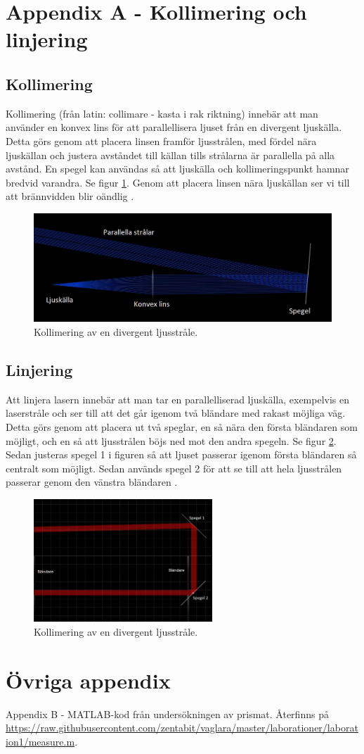 \documentclass[a4paper]{article}
\begin{document}
\pagebreak
\section{Appendix A - Kollimering och linjering}
\subsection{Kollimering}
Kollimering (från latin: collimare - kasta i rak riktning) innebär att man använder en konvex lins
för att parallellisera ljuset från en divergent ljuskälla. Detta görs genom att placera linsen
framför ljusstrålen, med fördel nära ljuskällan och justera avståndet till källan tills strålarna är parallella
på alla avstånd. En spegel kan användas så att ljuskälla och kollimeringspunkt hamnar bredvid varandra. Se figur \ref{fig:kollimering}.
Genom att placera linsen nära ljuskällan ser vi till att brännvidden blir oändlig \cite{yt1}.
\begin{figure}[h]
    \includegraphics[width=\textwidth]{kollimera3.jpg}
    \caption{Kollimering av en divergent ljusstråle.}
    \label{fig:kollimering}
\end{figure}
\subsection{Linjering}
Att linjera lasern innebär att man tar en parallelliserad ljuskälla, exempelvis en laserstråle och ser till att det går igenom två bländare med rakast möjliga väg.
Detta görs genom att placera ut två speglar, en så nära den första bländaren som möjligt, och en så att ljusstrålen böjs ned mot den andra spegeln. Se figur \ref{fig:linjering}.
Sedan justeras spegel 1 i figuren så att ljuset passerar igenom första bländaren så centralt som möjligt. Sedan används spegel 2 för att se till att hela ljusstrålen passerar
genom den vänstra bländaren \cite{yt2}.
\begin{figure}[h]
    \centering
    \includegraphics[width=0.6\textwidth]{linjera4.jpg}
    \caption{Kollimering av en divergent ljusstråle.}
    \label{fig:linjering}
\end{figure}
\pagebreak
\section{Övriga appendix}
Appendix B - MATLAB-kod från undersökningen av prismat. Återfinns på \url{https://raw.githubusercontent.com/zentabit/vaglara/master/laborationer/laboration1/measure.m}.
\end{document}
